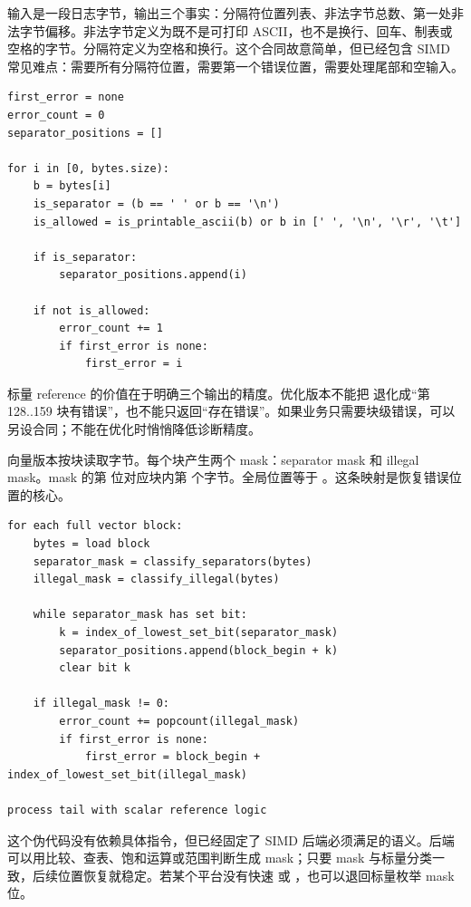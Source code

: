 输入是一段日志字节，输出三个事实：分隔符位置列表、非法字节总数、第一处非法字节偏移。非法字节定义为既不是可打印 ASCII，也不是换行、回车、制表或空格的字节。分隔符定义为空格和换行。这个合同故意简单，但已经包含 SIMD 常见难点：需要所有分隔符位置，需要第一个错误位置，需要处理尾部和空输入。

\begin{lstlisting}[numbers=none,caption={ASCII 分类的标量语义伪代码}]
first_error = none
error_count = 0
separator_positions = []

for i in [0, bytes.size):
    b = bytes[i]
    is_separator = (b == ' ' or b == '\n')
    is_allowed = is_printable_ascii(b) or b in [' ', '\n', '\r', '\t']

    if is_separator:
        separator_positions.append(i)

    if not is_allowed:
        error_count += 1
        if first_error is none:
            first_error = i
\end{lstlisting}

标量 reference 的价值在于明确三个输出的精度。优化版本不能把  退化成“第 128..159 块有错误”，也不能只返回“存在错误”。如果业务只需要块级错误，可以另设合同；不能在优化时悄悄降低诊断精度。

向量版本按块读取字节。每个块产生两个 mask：separator mask 和 illegal mask。mask 的第  位对应块内第  个字节。全局位置等于 。这条映射是恢复错误位置的核心。

\begin{lstlisting}[numbers=none,caption={向量块处理的语义伪代码}]
for each full vector block:
    bytes = load block
    separator_mask = classify_separators(bytes)
    illegal_mask = classify_illegal(bytes)

    while separator_mask has set bit:
        k = index_of_lowest_set_bit(separator_mask)
        separator_positions.append(block_begin + k)
        clear bit k

    if illegal_mask != 0:
        error_count += popcount(illegal_mask)
        if first_error is none:
            first_error = block_begin + index_of_lowest_set_bit(illegal_mask)

process tail with scalar reference logic
\end{lstlisting}

这个伪代码没有依赖具体指令，但已经固定了 SIMD 后端必须满足的语义。后端可以用比较、查表、饱和运算或范围判断生成 mask；只要 mask 与标量分类一致，后续位置恢复就稳定。若某个平台没有快速  或 ，也可以退回标量枚举 mask 位。

